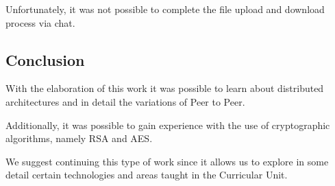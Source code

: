 \documentclass[extendedabs]{recpad2k}
\begin{document}
Unfortunately, it was not possible to complete the file upload and download process via chat.

\subsection{Conclusion}

With the elaboration of this work it was possible to learn about distributed architectures and in detail the variations of Peer to Peer.

Additionally, it was possible to gain experience with the use of cryptographic algorithms, namely RSA and AES.

We suggest continuing this type of work since it allows us to explore in some detail certain technologies and areas taught in the Curricular Unit.


\end{document}
